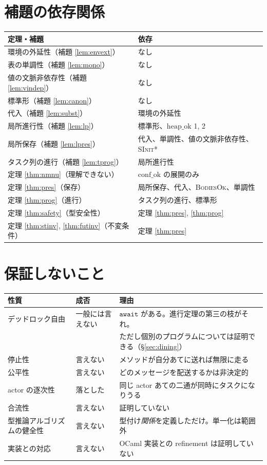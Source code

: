 \documentclass[11pt,a4paper]{ltjsarticle}
\theoremstyle{definition}
\theoremstyle{remark}
\newcommand{\heapok}{\mathrm{heap\_ok}}
\newcommand{\confok}{\mathrm{conf\_ok}}
\begin{document}
\section{補題の依存関係}

\begin{center}
\begin{tabular}{@{}ll@{}}
\toprule
定理・補題 & 依存 \\
\midrule
環境の外延性（補題 \ref{lem:envext}） & なし \\
表の単調性（補題 \ref{lem:mono}） & なし \\
値の文脈非依存性（補題 \ref{lem:vindep}） & なし \\
標準形（補題 \ref{lem:canon}） & なし \\
代入（補題 \ref{lem:subst}） & 環境の外延性 \\
局所進行性（補題 \ref{lem:lp}） & 標準形、$\heapok$ 1, 2 \\
局所保存（補題 \ref{lem:lpres}） & 代入、単調性、値の文脈非依存性、\textsc{SInit*} \\
タスク列の進行（補題 \ref{lem:tprog}） & 局所進行性 \\
定理 \ref{thm:nmnu}（理解できない）& $\confok$ の展開のみ \\
定理 \ref{thm:pres}（保存）& 局所保存、代入、\textsc{BodiesOk}、単調性 \\
定理 \ref{thm:prog}（進行）& タスク列の進行、標準形 \\
定理 \ref{thm:safety}（型安全性）& 定理 \ref{thm:pres}, \ref{thm:prog} \\
定理 \ref{thm:stinv}, \ref{thm:futinv}（不変条件）& 定理 \ref{thm:pres} \\
\bottomrule
\end{tabular}
\end{center}

\section{保証しないこと}
\label{sec:limits}

\begin{center}
\begin{tabular}{@{}lll@{}}
\toprule
性質 & 成否 & 理由 \\
\midrule
デッドロック自由 & 一般には言えない
  & $\mathtt{await}$ がある。進行定理の第三の枝がそれ。\\
 & & ただし個別のプログラムについては証明できる（\S\ref{sec:dining}）\\
停止性 & 言えない
  & メソッドが自分あてに送れば無限に走る \\
公平性 & 言えない
  & どのメッセージを配送するかは非決定的 \\
actor の逐次性 & 落とした
  & 同じ actor あての二通が同時にタスクになりうる \\
合流性 & 言えない & 証明していない \\
型推論アルゴリズムの健全性 & 言えない
  & 型付け\emph{関係}を定義しただけ。単一化は範囲外 \\
実装との対応 & 言えない
  & OCaml 実装との refinement は証明していない \\
\bottomrule
\end{tabular}
\end{center}
\end{document}
